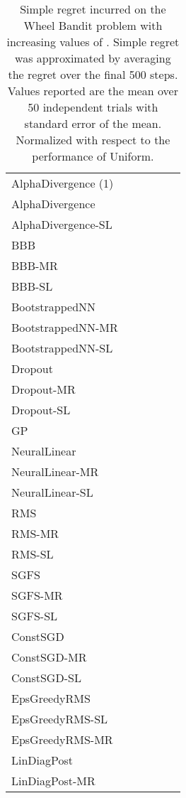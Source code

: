 \documentclass{article} \usepackage{iclr2018_conference,times}
\begin{document}
\begin{landscape}
\begin{table}[ht]
  \caption{Simple regret incurred on the Wheel Bandit problem with increasing values of . Simple regret was approximated by averaging the regret over the final 500 steps. Values reported are the mean over 50 independent trials with standard error of the mean. Normalized with respect to the performance of Uniform.}
  \label{tb:wheel-simpleregret}
  \centering
  \footnotesize
  \tiny
\begin{tabular}{llllll}
 &  &  &  &  &  \\
\midrule
AlphaDivergence (1) & & & & &  \\
AlphaDivergence & & & & &  \\
AlphaDivergence-SL & & & & &  \\
BBB & & & & &  \\
BBB-MR & & & & &  \\
BBB-SL & & & & &  \\
BootstrappedNN & & & & &  \\
BootstrappedNN-MR & & & & &  \\
BootstrappedNN-SL & & & & &  \\
Dropout & & & & &  \\
Dropout-MR & & & & &  \\
Dropout-SL & & & & &  \\
GP & & & & &  \\
NeuralLinear & \bm{}& \bm{}& \bm{}& &  \\
NeuralLinear-MR & \bm{}& \bm{}& \bm{}& \bm{}&  \\
NeuralLinear-SL & & & & &  \\
RMS & & & & &  \\
RMS-MR & & & & &  \\
RMS-SL & & & & &  \\
SGFS & & & & &  \\
SGFS-MR & & & & &  \\
SGFS-SL & & & & &  \\
ConstSGD & & & & &  \\
ConstSGD-MR & & & & &  \\
ConstSGD-SL & & & & &  \\
EpsGreedyRMS & & & & &  \\
EpsGreedyRMS-SL & & & & &  \\
EpsGreedyRMS-MR & & & & &  \\
LinDiagPost & & & & & \bm{} \\
LinDiagPost-MR & & & & &  \\

\end{tabular}
\end{table}
\end{landscape}
\end{document}
